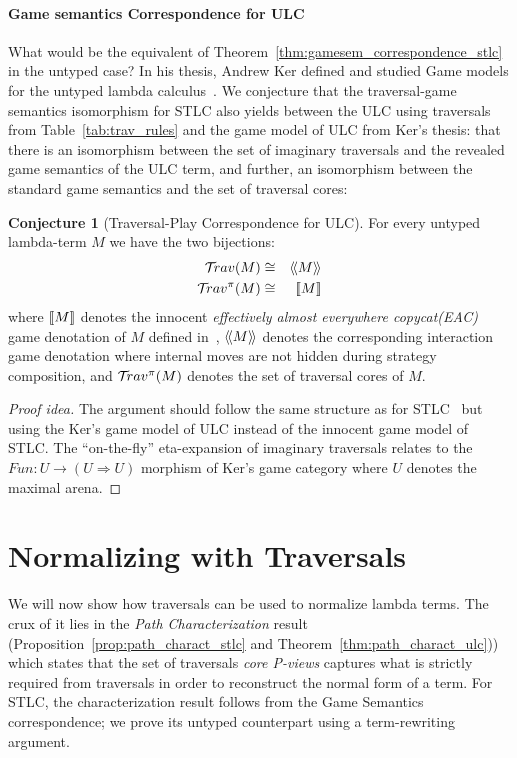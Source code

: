 \documentclass{article}
\theoremstyle{plain}
\theoremstyle{definition}
\newtheorem{conjecture}{Conjecture}[section]
\theoremstyle{remark}
\newcommand{\travulc}{\travset}
\def\coresymbol{\pi} %
\begin{document}
\paragraph{Game semantics Correspondence for ULC}
What would be the equivalent of Theorem~\ref{thm:gamesem_correspondence_stlc} in the untyped case? In his thesis, Andrew Ker defined and studied Game models for the untyped lambda calculus~\cite{KerThesis}.  We conjecture that the traversal-game semantics isomorphism for STLC also yields between the ULC using traversals from Table~\ref{tab:trav_rules} and the game model of ULC from Ker's thesis: that there is an isomorphism between the set of imaginary traversals and the revealed game semantics of the ULC term, and further, an isomorphism between the standard game semantics and the set of traversal cores:

\begin{conjecture}[Traversal-Play Correspondence for ULC]
\label{conj:ulc_corresp}
For every untyped lambda-term $M$ we have the two bijections:
\begin{eqnarray*}
 \travulc(M) &\cong& \revsem{M} \\
 \travulc^\coresymbol(M) &\cong& \sem{M}
\end{eqnarray*}
where ${[\![ M ]\!]}$ denotes the innocent \emph{effectively almost everywhere copycat(EAC)} game denotation of $M$ defined in~\cite{KerThesis},
${\langle\!\langle M \rangle\!\rangle}$ denotes the corresponding interaction game denotation where internal moves are not hidden during strategy composition,
and $\travulc^\coresymbol(M)$ denotes the set of traversal cores of $M$.
\end{conjecture}

\begin{proof}[Proof idea]
The argument should follow the same structure as for STLC~\cite{BlumPhd} but using the Ker's game model of ULC instead of the innocent game model of STLC. The ``on-the-fly'' eta-expansion of imaginary traversals relates to the $Fun : U \rightarrow (U \Rightarrow U)$ morphism of Ker's game category where $U$ denotes the maximal arena.
\end{proof}

\section{Normalizing with Traversals}

We will now show how traversals can be used to normalize lambda terms. The crux of it lies in the \emph{Path Characterization} result (Proposition~\ref{prop:path_charact_stlc} and Theorem~\ref{thm:path_charact_ulc})) which states that the set of traversals \emph{core P-views} captures what is strictly required from traversals in order to reconstruct the normal form of a term.
For STLC, the characterization result follows from the Game Semantics correspondence; we prove its untyped counterpart using a term-rewriting argument.
\end{document}
